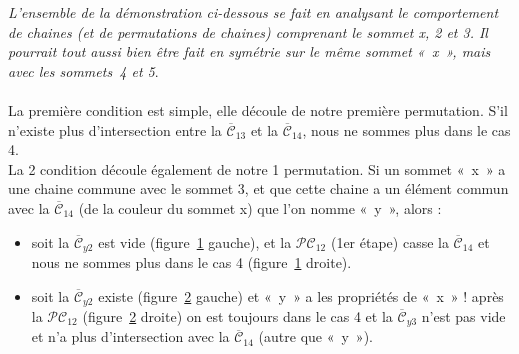 \documentclass[french]{report}
\begin{document}
\begin{adjustwidth}{3.5em}{0pt}
\begin{description}
\textit{L'ensemble de la démonstration ci-dessous se fait en analysant le comportement de chaines (et de permutations de chaines) comprenant le sommet x, 2 et 3. Il pourrait tout aussi bien être fait en symétrie sur le même sommet «~x~», mais avec les sommets~4 et 5}.
\\
\\
La première condition est simple, elle découle de notre première permutation. S'il n'existe plus d'intersection entre la  $\overline{\mathcal{C}}_{13}$ et la  $\overline{\mathcal{C}}_{14}$, nous ne sommes plus dans le cas 4.\\
La 2 condition découle également de notre 1 permutation. Si un sommet «~x~» a une chaine commune avec le sommet 3, et que cette chaine a un élément commun avec la  $\overline{\mathcal{C}}_{14}$ (de la couleur du sommet x) que l'on nomme «~y~», alors :
\begin{itemize}[label=--]
	\item
soit la  $\overline{\mathcal{C}}_{y2}$ est vide (figure~\ref{fig:cas4_etape1_6} gauche), et la  $\mathcal{PC}_{12}$ (1er étape) casse la  $\overline{\mathcal{C}}_{14}$ et nous ne sommes plus dans le cas 4 (figure~\ref{fig:cas4_etape1_6} droite). 
\begin{figure}[!ht]\centering
	\begin{changemargin}{0cm}{-3cm}
		\begin{center}
			
			\hspace{15pt}
			
		\end{center}
	\end{changemargin}
	\begin{changemargin}{3cm}{0cm}
	\caption{}\label{fig:cas4_etape1_6}
	\end{changemargin}
\end{figure}	
\FloatBarrier
	\item
soit la $\overline{\mathcal{C}}_{y2}$ existe (figure~\ref{fig:cas4_etape1_7} gauche) et «~y~» a les propriétés de «~x~» ! après la $\mathcal{PC}_{12}$ (figure~\ref{fig:cas4_etape1_7} droite) on est toujours dans le cas 4 et la $\overline{\mathcal{C}}_{y3}$ n'est pas vide et n'a plus d'intersection avec la $\overline{\mathcal{C}}_{14}$ (autre que «~y~»).
\begin{figure}[!ht]\centering
	\begin{changemargin}{0cm}{-3cm}
		\begin{center}
			
			\hspace{15pt}
			
		\end{center}
	\end{changemargin}
	\begin{changemargin}{3cm}{0cm}
	\caption{}\label{fig:cas4_etape1_7}
	\end{changemargin}
\end{figure}	
\FloatBarrier

\end{itemize}
\end{description}
\end{adjustwidth}
\end{document}

